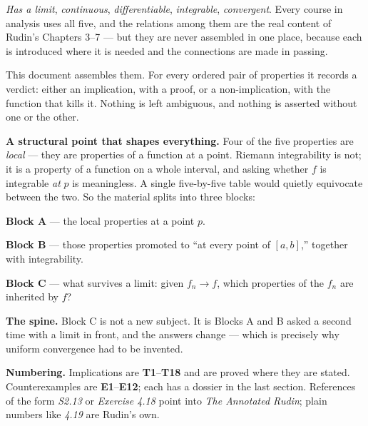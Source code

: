 
\begin{roadmap}
\raggedright
\emph{Has a limit}, \emph{continuous}, \emph{differentiable},
\emph{integrable}, \emph{convergent}. Every course in analysis uses all five,
and the relations among them are the real content of Rudin's Chapters
3--7 --- but they are never assembled in one place, because each is
introduced where it is needed and the connections are made in passing.

\medskip
This document assembles them. For every ordered pair of properties it
records a verdict: either an implication, with a proof, or a
non-implication, with the function that kills it. Nothing is left
ambiguous, and nothing is asserted without one or the other.

\medskip
\textbf{A structural point that shapes everything.} Four of the five
properties are \emph{local} --- they are properties of a function at a
point. Riemann integrability is not; it is a property of a function on a
whole interval, and asking whether $f$ is integrable \emph{at} $p$ is
meaningless. A single five-by-five table would quietly equivocate between
the two. So the material splits into three blocks:

\smallskip
\textbf{Block A} --- the local properties at a point $p$.

\smallskip
\textbf{Block B} --- those properties promoted to ``at every point of
$[a,b]$,'' together with integrability.

\smallskip
\textbf{Block C} --- what survives a limit: given $f_n \to f$, which
properties of the $f_n$ are inherited by $f$?

\medskip
\textbf{The spine.} Block C is not a new subject. It is Blocks A and B asked
a second time with a limit in front, and the answers change --- which is
precisely why uniform convergence had to be invented.

\medskip
\textbf{Numbering.} Implications are \textbf{T1}--\textbf{T18} and are
proved where they are stated. Counterexamples are \textbf{E1}--\textbf{E12};
each has a dossier in the last section. References of the form
\emph{S2.13} or \emph{Exercise 4.18} point into \emph{The Annotated Rudin};
plain numbers like \emph{4.19} are Rudin's own.
\end{roadmap}

